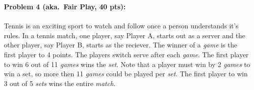 \documentclass[12pt]{article}
\begin{document}
\vskip0.25in
\newpage
\noindent\textbf{Problem 4 (aka.\ Fair Play, 40 pts):}

\paragraph{} Tennis is an exciting sport to watch and follow once a person understands it's rules. In a tennis match, one player, say Player A, starts out as a server and the other player, say Player B, starts as the reciever. The winner of a \emph{game} is the first player to 4 points. The players switch serve after each \emph{game}. The first player to win 6 out of 11 \emph{games} wins the \emph{set}. Note that a player must win by 2 \emph{games} to win a set, so more then 11 \emph{games} could be played per \emph{set}. The first player to win 3 out of 5 \emph{sets} wins the entire \emph{match}.
\end{document}
